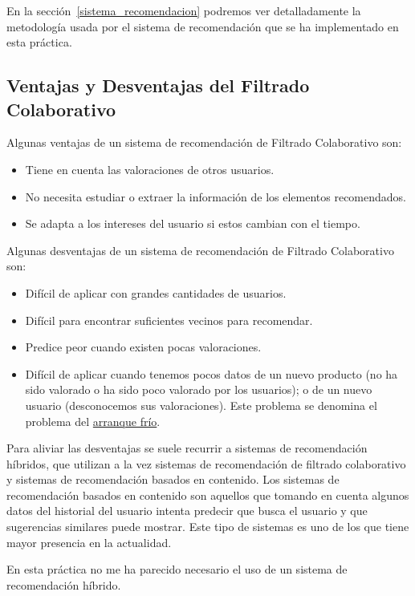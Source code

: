 \documentclass{uimppracticas}
\begin{document}
En la sección~\ref{sistema_recomendacion} podremos ver detalladamente la metodología usada por el sistema de recomendación que se ha implementado en esta práctica.

\subsection{Ventajas y Desventajas del Filtrado Colaborativo}\label{ventajas_desventajas}

Algunas ventajas de un sistema de recomendación de Filtrado Colaborativo son:

\begin{itemize}
	\item Tiene en cuenta las valoraciones de otros usuarios.
	\item No necesita estudiar o extraer la información de los elementos recomendados.
	\item Se adapta a los intereses del usuario si estos cambian con el tiempo.
\end{itemize}

Algunas desventajas de un sistema de recomendación de Filtrado Colaborativo son:

\begin{itemize}
	\item Difícil de aplicar con grandes cantidades de usuarios.
	\item Difícil para encontrar suficientes vecinos para recomendar.
	\item Predice peor cuando existen pocas valoraciones.
	\item Difícil de aplicar cuando tenemos pocos datos de un nuevo producto (no ha sido valorado o ha sido poco valorado por los usuarios); o de un nuevo usuario (desconocemos sus valoraciones). Este problema se denomina el problema del \href{https://es.wikipedia.org/wiki/Arranque_en_fr\%C3\%ADo}{arranque frío}.
\end{itemize}

Para aliviar las desventajas se suele recurrir a sistemas de recomendación híbridos, que utilizan a la vez sistemas de recomendación de filtrado colaborativo y sistemas de recomendación basados en contenido. Los sistemas de recomendación basados en contenido son aquellos que tomando en cuenta algunos datos del historial del usuario intenta predecir que busca el usuario y que sugerencias similares puede mostrar. Este tipo de sistemas es uno de los que tiene mayor presencia en la actualidad.

En esta práctica no me ha parecido necesario el uso de un sistema de recomendación híbrido.
\end{document}
